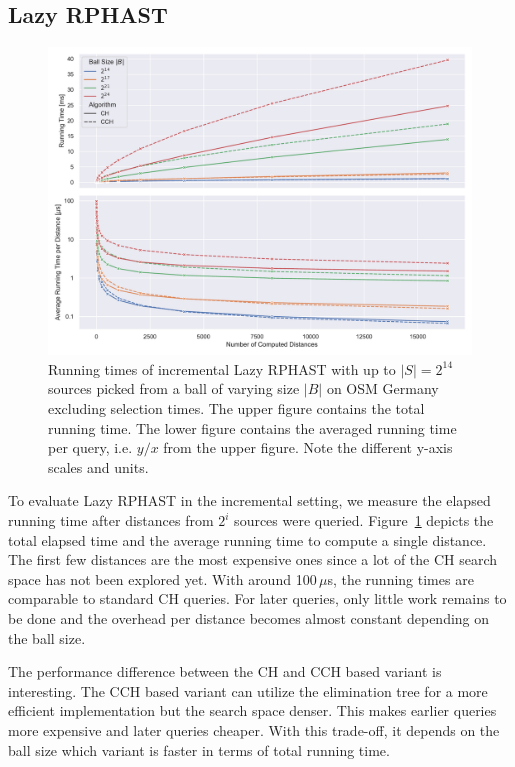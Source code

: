 \documentclass[manuscript,review]{acmart}
\begin{document}
\subsection{Lazy RPHAST}\label{sec:exp_lazy_rphast}

\begin{figure}
\centering
\includegraphics[width=\linewidth]{fig/lazy_rphast_inc.pdf}
\caption{
Running times of incremental Lazy RPHAST with up to $|S| = 2^{14}$ sources picked from a ball of varying size $|B|$ on OSM Germany excluding selection times.
The upper figure contains the total running time.
The lower figure contains the averaged running time per query, i.e. $y/x$ from the upper figure.
Note the different y-axis scales and units.
}\label{fig:lazy_rphast_inc}
\end{figure}

To evaluate Lazy RPHAST in the incremental setting, we measure the elapsed running time after distances from $2^i$ sources were queried.
Figure~\ref{fig:lazy_rphast_inc} depicts the total elapsed time and the average running time to compute a single distance.
The first few distances are the most expensive ones since a lot of the CH search space has not been explored yet.
With around 100\,$\mu$s, the running times are comparable to standard CH queries.
For later queries, only little work remains to be done and the overhead per distance becomes almost constant depending on the ball size.

The performance difference between the CH and CCH based variant is interesting.
The CCH based variant can utilize the elimination tree for a more efficient implementation but the search space denser.
This makes earlier queries more expensive and later queries cheaper.
With this trade-off, it depends on the ball size which variant is faster in terms of total running time.
\end{document}
